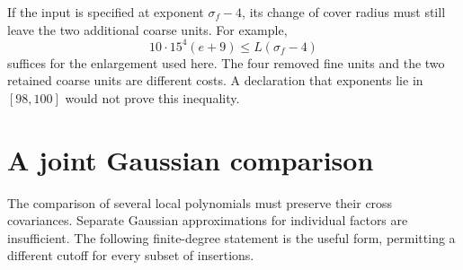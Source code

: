If the input is specified at exponent $\sigma_f-4$, its change
of cover radius must still leave the two additional coarse units. For example,
\[
 10\cdot15^4(e+9)\le L(\sigma_f-4)
\]
suffices for the enlargement used here.
The four removed fine units and the two retained coarse units are
different costs. A declaration that exponents lie in $[98,100]$
would not prove this inequality.

\section{A joint Gaussian comparison}

The comparison of several local polynomials must preserve their cross
covariances. Separate Gaussian approximations for individual factors
are insufficient. The following finite-degree statement is the useful
form, permitting a different cutoff for every subset of insertions.


